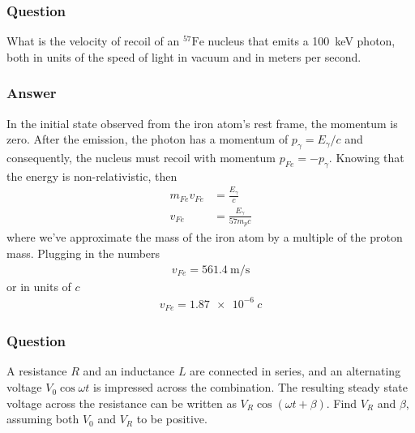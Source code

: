 \subsubsection{Question}

What is the velocity of recoil of an ${}^{57}\mathrm{Fe}$ nucleus that emits
a \SI{100}{\keV} photon, both in units of the speed of light in vacuum and in
meters per second.

\subsubsection{Answer}

In the initial state observed from the iron atom's rest frame, the momentum
is zero. After the emission, the photon has a momentum of $p_\gamma = E_\gamma/c$ and
consequently, the nucleus must recoil with momentum $p_{Fe} = -p_\gamma$. Knowing
that the energy is non-relativistic, then
\begin{align*}
    m_{Fe}v_{Fe} &= \frac{E_\gamma }{c} \\
    v_{Fe} &= \frac{E_\gamma }{57m_p c}
\end{align*}
where we've approximate the mass of the iron atom by a multiple of the proton
mass. Plugging in the numbers
\begin{align}
    \boxed{ v_{Fe} = \SI{561.4}{\m\per\s} }
\end{align}
or in units of $c$
\begin{align}
    \boxed{ v_{Fe} = \SI{1.87e-6}{c} }
\end{align}

\subsubsection{Question}

A resistance $R$ and an inductance $L$ are connected in series, and an
alternating voltage $V_0\cos {\omega} t$ is impressed across the combination. The
resulting steady state voltage across the resistance can be written as $V_R
\cos({\omega} t + \beta)$. Find $V_R$ and $\beta$, assuming both $V_0$ and $V_R$ to be
positive.

